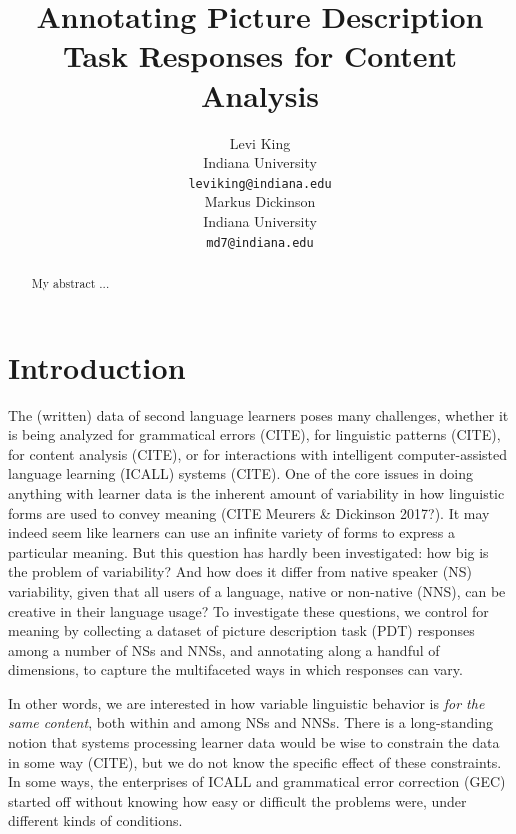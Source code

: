 \documentclass[11pt,a4paper]{article}
\title{Annotating Picture Description Task Responses for Content Analysis}
\author{Levi King \\
  Indiana University \\
  {\tt leviking@indiana.edu} \\\And
  Markus Dickinson \\
  Indiana University \\
  {\tt md7@indiana.edu} \\}
\date{}
\begin{document}
\maketitle
\begin{abstract}
My abstract ...

\end{abstract}


\section{Introduction}

The (written) data of second language learners poses many challenges,
whether it is being analyzed for grammatical errors (CITE), for
linguistic patterns (CITE), for content analysis (CITE), or for
interactions with intelligent computer-assisted language learning
(ICALL) systems (CITE).  One of the core issues in doing anything with
learner data is the inherent amount of variability in how linguistic
forms are used to convey meaning (CITE Meurers \& Dickinson 2017?).
It may indeed seem like learners can use an infinite variety of forms
to express a particular meaning.  But this question has hardly been
investigated: how big is the problem of variability?  And how does it
differ from native speaker (NS) variability, given that all users of a
language, native or non-native (NNS), can be creative in their
language usage?  To investigate these questions, we control for
meaning by collecting a dataset of picture description task (PDT)
responses among a number of NSs and NNSs, and annotating along a
handful of dimensions, to capture the multifaceted ways in which
responses can vary.


In other words, we are interested in how variable linguistic behavior
is \emph{for the same content}, both within and among NSs and NNSs.
There is a long-standing notion that systems processing learner data
would be wise to constrain the data in some way (CITE), but we do not
know the specific effect of these constraints.  In some ways, the
enterprises of ICALL and grammatical error correction (GEC) started
off without knowing how easy or difficult the problems were, under
different kinds of conditions.
\end{document}
